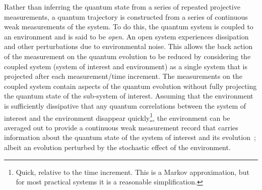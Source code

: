 \documentclass[conference]{IEEEtran}
\begin{document}
Rather than inferring the quantum state from a series of repeated projective measurements, a quantum trajectory is constructed from a series of continuous weak measurements of the system. To do this, the quantum system is coupled to an environment and is said to be {\it open}. An open system experiences dissipation and other perturbations due to environmental noise. This allows the back action of the measurement on the quantum evolution to be reduced by considering the coupled system (system of interest and environment) as a single system that is projected after each measurement/time increment. The measurements on the coupled system contain aspects of the quantum evolution without fully projecting the quantum state of the sub-system of interest. Assuming that the environment is sufficiently dissipative that any quantum correlations between the system of interest and the environment disappear quickly\footnote{Quick, relative to the time increment. This is a Markov approximation, but for most practical systems it is a reasonable simplification.}, the environment can be averaged out to provide a continuous weak measurement record that carries information about the quantum state of the system of interest and its evolution~\cite{Wis2010,Jac2014}; albeit an evolution perturbed by the stochastic effect of the environment. 
\end{document}

